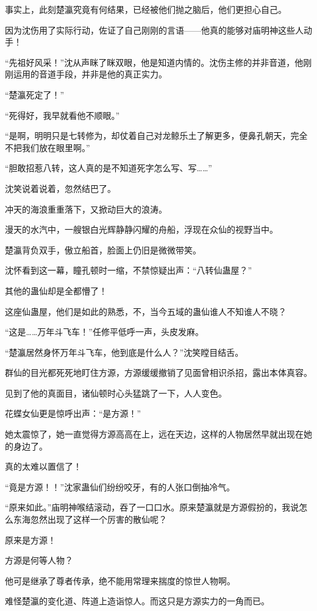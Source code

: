 \begin{this_body}
事实上，此刻楚瀛究竟有何结果，已经被他们抛之脑后，他们更担心自己。

因为沈伤用了实际行动，佐证了自己刚刚的言语——他真的能够对庙明神这些人动手！

“先祖好风采！”沈从声眯了眯双眼，他是知道内情的。沈伤主修的并非音道，他刚刚运用的音道手段，并非是他的真正实力。

“楚瀛死定了！”

“死得好，我早就看他不顺眼。”

“是啊，明明只是七转修为，却仗着自己对龙鲸乐土了解更多，便鼻孔朝天，完全不把我们放在眼里啊。”

“胆敢招惹八转，这人真的是不知道死字怎么写、写……”

沈笑说着说着，忽然结巴了。

冲天的海浪重重落下，又掀动巨大的浪涛。

漫天的水汽中，一艘银白光辉静静闪耀的舟船，浮现在众仙的视野当中。

楚瀛背负双手，傲立船首，脸面上仍旧是微微带笑。

沈怀看到这一幕，瞳孔顿时一缩，不禁惊疑出声：“八转仙蛊屋？”

其他的蛊仙却是全都懵了！

这座仙蛊屋，他们是如此的熟悉，不，当今五域的蛊仙谁人不知谁人不晓？

“这是……万年斗飞车！”任修平低呼一声，头皮发麻。

“楚瀛居然身怀万年斗飞车，他到底是什么人？”沈笑瞠目结舌。

群仙的目光都死死地盯住方源，方源缓缓撤销了见面曾相识杀招，露出本体真容。

见到了他的真面目，诸仙顿时心头猛跳了一下，人人变色。

花蝶女仙更是惊呼出声：“是方源！”

她太震惊了，她一直觉得方源高高在上，远在天边，这样的人物居然早就出现在她的身边了。

真的太难以置信了！

“竟是方源！！”沈家蛊仙们纷纷咬牙，有的人张口倒抽冷气。

“原来如此。”庙明神喉结滚动，吞了一口口水。原来楚瀛就是方源假扮的，我说怎么东海忽然出现了这样一个厉害的散仙呢？

原来是方源！

方源是何等人物？

他可是继承了尊者传承，绝不能用常理来揣度的惊世人物啊。

难怪楚瀛的变化道、阵道上造诣惊人。而这只是方源实力的一角而已。


\end{this_body}
